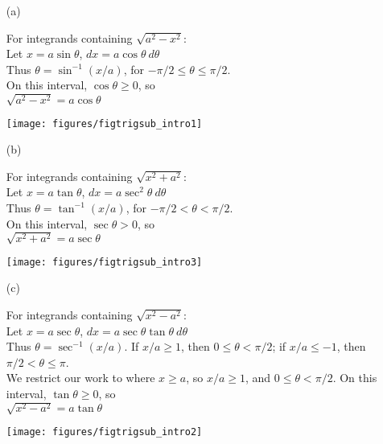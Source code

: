 \setboxwidth{100pt}
{\begin{enumerate}
	\item[(a)] \noindent%
		\begin{minipage}[t]{.6\linewidth}%
		For integrands containing $\sqrt{a^2-x^2}$:\smallskip\\
		Let $x=a\sin\theta$, \qquad $dx = a\cos\theta\ d\theta$\\[5pt]	
	Thus $\theta = \sin^{-1}(x/a)$, for $-\pi/2\leq \theta\leq \pi/2$. \\[5pt]	
	On this interval, $\cos\theta\geq 0$, so\\[5pt]	
	$\sqrt{a^2-x^2} = a\cos\theta$
		\end{minipage}\qquad
	\begin{minipage}[t]{.4\linewidth}\vskip 0pt
		\texttt{[image: figures/figtrigsub\_intro1]}
		\end{minipage}
		
	\item[(b)] \noindent
	\begin{minipage}[t]{.6\linewidth}
		For integrands containing $\sqrt{x^2+a^2}$:\\[5pt]
		Let $x=a\tan\theta$, \qquad $dx = a\sec^2\theta\ d\theta$\\[5pt]	
	Thus $\theta = \tan^{-1}(x/a)$, for $-\pi/2 < \theta < \pi/2$. \\[5pt]	
	On this interval, $\sec\theta> 0$, so\\[5pt]	
	$\sqrt{x^2+a^2} = a\sec\theta$
		\end{minipage}\qquad
	\begin{minipage}[t]{.4\linewidth}\vskip 0pt
		\texttt{[image: figures/figtrigsub\_intro3]}
		\end{minipage}
		
	\item[(c)] \noindent
	\begin{minipage}[t]{.6\linewidth}
		For integrands containing $\sqrt{x^2-a^2}$:\\[5pt]
		Let $x=a\sec\theta$, \qquad $dx = a\sec\theta\tan\theta\ d\theta$\\[5pt]	
	Thus $\theta = \sec^{-1}(x/a)$. If $x/a\geq 1$, then $0\leq\theta<\pi/2$; if $x/a \leq -1$, then $\pi/2<\theta\leq \pi$.\\[5pt]	
	We restrict our work to where $x\geq a$, so $x/a\geq 1$, and $0\leq\theta<\pi/2$.
	On this interval, $\tan\theta\geq 0$, so\\[5pt]	
	$\sqrt{x^2-a^2} = a\tan\theta$
		\end{minipage}\qquad
	\begin{minipage}[t]{.4\linewidth}\vskip 0pt
		\texttt{[image: figures/figtrigsub\_intro2]}
		\end{minipage}	
\end{enumerate}}

